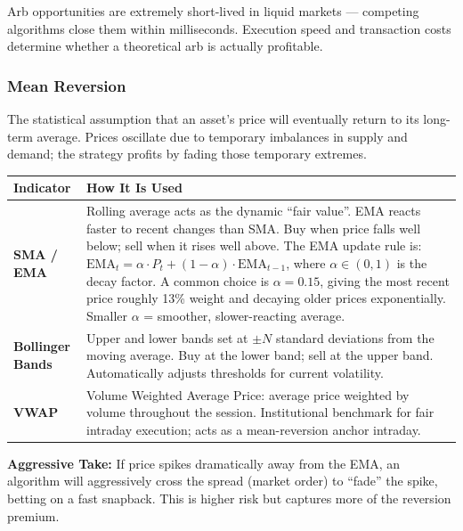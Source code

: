 \begin{warningbox}
Arb opportunities are extremely short-lived in liquid markets — competing algorithms
close them within milliseconds. Execution speed and transaction costs determine
whether a theoretical arb is actually profitable.
\end{warningbox}

\subsubsection{Mean Reversion}

The statistical assumption that an asset's price will eventually return to its
long-term average. Prices oscillate due to temporary imbalances in supply and demand;
the strategy profits by fading those temporary extremes.

\begin{center}
\begin{tabular}{>{\bfseries}p{3.5cm} p{9cm}}
\toprule
Indicator & How It Is Used \\
\midrule
SMA / EMA & Rolling average acts as the dynamic ``fair value''. EMA reacts faster
            to recent changes than SMA. Buy when price falls well below; sell when
            it rises well above. The EMA update rule is:
            $\text{EMA}_t = \alpha \cdot P_t + (1 - \alpha) \cdot \text{EMA}_{t-1}$,
            where $\alpha \in (0,1)$ is the decay factor. A common choice is
            $\alpha = 0.15$, giving the most recent price roughly 13\% weight and
            decaying older prices exponentially. Smaller $\alpha$ = smoother,
            slower-reacting average. \\
Bollinger Bands & Upper and lower bands set at $\pm N$ standard deviations from the
                  moving average. Buy at the lower band; sell at the upper band.
                  Automatically adjusts thresholds for current volatility. \\
VWAP & Volume Weighted Average Price: average price weighted by volume throughout
       the session. Institutional benchmark for fair intraday execution; acts as
       a mean-reversion anchor intraday. \\
\bottomrule
\end{tabular}
\end{center}

\begin{notebox}
\textbf{Aggressive Take:} If price spikes dramatically away from the EMA, an algorithm
will aggressively cross the spread (market order) to ``fade'' the spike, betting on a
fast snapback. This is higher risk but captures more of the reversion premium.
\end{notebox}

